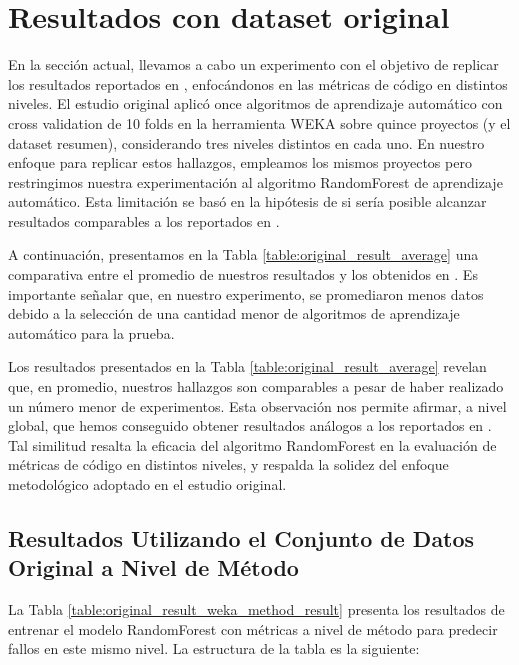 \section{Resultados con dataset original}
\label{sec:datasetoriginal}

En la sección actual, llevamos a cabo un experimento con el objetivo de replicar los resultados reportados en \cite{ferenc_automatically_2020}, enfocándonos en las métricas de código en distintos niveles. El estudio original aplicó once algoritmos de aprendizaje automático con cross validation de 10 folds en la herramienta WEKA sobre quince proyectos (y el dataset resumen), considerando tres niveles distintos en cada uno. En nuestro enfoque para replicar estos hallazgos, empleamos los mismos proyectos pero restringimos nuestra experimentación al algoritmo RandomForest de aprendizaje automático. Esta limitación se basó en la hipótesis de si sería posible alcanzar resultados comparables a los reportados en \cite{ferenc_automatically_2020}.

A continuación, presentamos en la Tabla \ref{table:original_result_average} una comparativa entre el promedio de nuestros resultados y los obtenidos en \cite{ferenc_automatically_2020}. Es importante señalar que, en nuestro experimento, se promediaron menos datos debido a la selección de una cantidad menor de algoritmos de aprendizaje automático para la prueba.



Los resultados presentados en la Tabla \ref{table:original_result_average} revelan que, en promedio, nuestros hallazgos son comparables a pesar de haber realizado un número menor de experimentos. Esta observación nos permite afirmar, a nivel global, que hemos conseguido obtener resultados análogos a los reportados en \cite{ferenc_automatically_2020}. Tal similitud resalta la eficacia del algoritmo RandomForest en la evaluación de métricas de código en distintos niveles, y respalda la solidez del enfoque metodológico adoptado en el estudio original.

\subsection{Resultados Utilizando el Conjunto de Datos Original a Nivel de Método}
La Tabla \ref{table:original_result_weka_method_result} presenta los resultados de entrenar el modelo RandomForest con métricas a nivel de método para predecir fallos en este mismo nivel. La estructura de la tabla es la siguiente:

